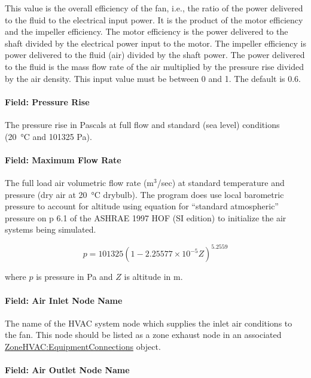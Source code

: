 This value is the overall efficiency of the fan, i.e., the ratio of the power delivered to the fluid to the electrical input power. It is the product of the motor efficiency and the impeller efficiency. The motor efficiency is the power delivered to the shaft divided by the electrical power input to the motor. The impeller efficiency is power delivered to the fluid (air) divided by the shaft power. The power delivered to the fluid is the mass flow rate of the air multiplied by the pressure rise divided by the air density. This input value must be between 0 and 1. The default is 0.6.

\paragraph{Field: Pressure Rise}\label{field-pressure-rise-3}

The pressure rise in Pascals at full flow and standard (sea level) conditions (\SI{20}{\celsius} and 101325 Pa).

\paragraph{Field: Maximum Flow Rate}\label{field-maximum-flow-rate-3}

The full load air volumetric flow rate (m\(^{3}\)/sec) at standard temperature and pressure (dry air at \SI{20}{\celsius} drybulb). The program does use local barometric pressure to account for altitude using equation for ``standard atmospheric'' pressure on p 6.1 of the ASHRAE 1997 HOF (SI edition) to initialize the air systems being simulated.

\begin{equation}
p = 101325 \left(1 - 2.25577 \times 10^{-5} Z\right)^{5.2559}
\end{equation}

where \(p\) is pressure in Pa and \(Z\) is altitude in m.

\paragraph{Field: Air Inlet Node Name}\label{field-air-inlet-node-name-3-000}

The name of the HVAC system node which supplies the inlet air conditions to the fan. This node should be listed as a zone exhaust node in an associated \hyperref[zonehvacequipmentconnections]{ZoneHVAC:EquipmentConnections} object.

\paragraph{Field: Air Outlet Node Name}\label{field-air-outlet-node-name-3-000}

